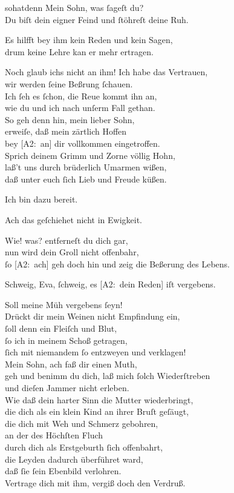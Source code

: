 \documentclass[abbrwidth=6em,tocstyle=ref-genre]{ees}
\newcommand\altlyrics[1]{[\textmd{A2}:~#1]}
\begin{document}
{\begin{movement}{sohatdenn}
  \voice[Eva]
  Mein Sohn, was ſageſt du?\\
  Du biſt dein eigner Feind und ſtöhreſt deine Ruh.

  \voice[Adam]
  Es hilfft bey ihm kein Reden und kein Sagen,\\
  drum keine Lehre kan er mehr ertragen.

  \voice[Eva]
  Noch glaub ichs nicht an ihm! Ich habe das Vertrauen,\\
  wir werden ſeine Beßrung ſchauen.\\
  Ich ſeh es ſchon, die Reue kommt ihn an,\\
  wie du und ich nach unſerm Fall gethan.\\
  So geh denn hin, mein lieber Sohn,\\
  erweiſe, daß mein zärtlich Hoffen\\
  bey \altlyrics{an} dir vollkommen eingetroffen.\\
  Sprich deinem Grimm und Zorne völlig Hohn,\\
  laß't uns durch brüderlich Umarmen wißen,\\
  daß unter euch ſich Lieb und Freude küßen.

  \voice[Abel]
  Ich bin dazu bereit.

  \voice[Cain]
  Ach das geſchiehet nicht in Ewigkeit.

  \voice[Eva]
  Wie! was? entferneſt du dich gar,\\
  nun wird dein Groll nicht offenbahr,\\
  ſo \altlyrics{ach} geh doch hin und zeig die Beßerung des Lebens.

  \voice[Cain]
  Schweig, Eva, ſchweig, es \altlyrics{dein Reden} iſt vergebens.

  \voice[Eva]
  Soll meine Müh vergebens ſeyn!\\
  Drückt dir mein Weinen nicht Empfindung ein,\\
  ſoll denn ein Fleiſch und Blut,\\
  ſo ich in meinem Schoß getragen,\\
  ſich mit niemandem ſo entzweyen und verklagen!\\
  Mein Sohn, ach faß dir einen Muth,\\
  geh und benimm du dich, laß mich ſolch Wiederſtreben\\
  und dieſen Jammer nicht erleben.\\
  Wie daß dein harter Sinn die Mutter wiederbringt,\\
  die dich als ein klein Kind an ihrer Bruſt geſäugt,\\
  die dich mit Weh und Schmerz gebohren,\\
  an der des Höchſten Fluch\\
  durch dich als Erstgeburth ſich offenbahrt,\\
  die Leyden dadurch überführet ward,\\
  daß ſie ſein Ebenbild verlohren.\\
  Vertrage dich mit ihm, vergiß doch den Verdruß.


\end{movement}}
\end{document}
